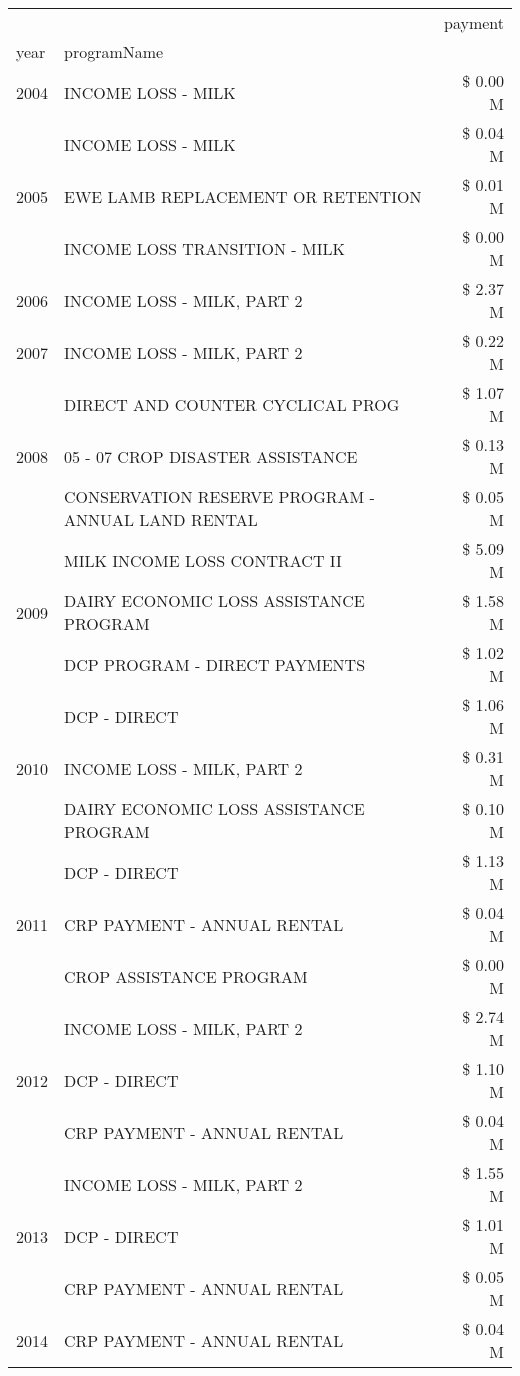 \begin{tabular}{llr}
\toprule
 &  & payment \\
year & programName &  \\
\midrule
2004 & INCOME LOSS - MILK & \$ 0.00 M \\
\cline{1-3}
\multirow[t]{3}{*}{2005} & INCOME LOSS - MILK & \$ 0.04 M \\
 & EWE LAMB REPLACEMENT OR RETENTION & \$ 0.01 M \\
 & INCOME LOSS TRANSITION - MILK & \$ 0.00 M \\
\cline{1-3}
2006 & INCOME LOSS - MILK, PART 2 & \$ 2.37 M \\
\cline{1-3}
2007 & INCOME LOSS - MILK, PART 2 & \$ 0.22 M \\
\cline{1-3}
\multirow[t]{3}{*}{2008} & DIRECT AND COUNTER CYCLICAL PROG & \$ 1.07 M \\
 & 05 - 07 CROP DISASTER ASSISTANCE & \$ 0.13 M \\
 & CONSERVATION RESERVE PROGRAM - ANNUAL LAND RENTAL & \$ 0.05 M \\
\cline{1-3}
\multirow[t]{3}{*}{2009} & MILK INCOME LOSS CONTRACT II & \$ 5.09 M \\
 & DAIRY ECONOMIC LOSS ASSISTANCE PROGRAM & \$ 1.58 M \\
 & DCP PROGRAM - DIRECT PAYMENTS & \$ 1.02 M \\
\cline{1-3}
\multirow[t]{3}{*}{2010} & DCP - DIRECT & \$ 1.06 M \\
 & INCOME LOSS - MILK, PART 2 & \$ 0.31 M \\
 & DAIRY ECONOMIC LOSS ASSISTANCE PROGRAM & \$ 0.10 M \\
\cline{1-3}
\multirow[t]{3}{*}{2011} & DCP - DIRECT & \$ 1.13 M \\
 & CRP PAYMENT - ANNUAL RENTAL & \$ 0.04 M \\
 & CROP ASSISTANCE PROGRAM & \$ 0.00 M \\
\cline{1-3}
\multirow[t]{3}{*}{2012} & INCOME LOSS - MILK, PART 2 & \$ 2.74 M \\
 & DCP - DIRECT & \$ 1.10 M \\
 & CRP PAYMENT - ANNUAL RENTAL & \$ 0.04 M \\
\cline{1-3}
\multirow[t]{3}{*}{2013} & INCOME LOSS - MILK, PART 2 & \$ 1.55 M \\
 & DCP - DIRECT & \$ 1.01 M \\
 & CRP PAYMENT - ANNUAL RENTAL & \$ 0.05 M \\
\cline{1-3}
\multirow[t]{2}{*}{2014} & CRP PAYMENT - ANNUAL RENTAL & \$ 0.04 M \\

\end{tabular}
